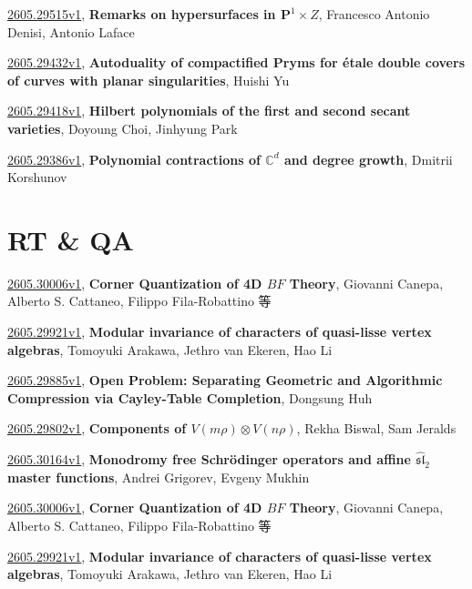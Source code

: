 \documentclass[9pt, a4paper]{article}
\theoremstyle{plain}
\theoremstyle{definition}
\theoremstyle{remark}
\newcommand{\arxiv}[3]{\href{https://arxiv.org/abs/#1}{#1}, \textbf{\textcolor{arxivblue}{#2}}, #3}
\begin{document}
\arxiv{2605.29515v1}{Remarks on hypersurfaces in $\mathbf{P}^1\times Z$}{Francesco Antonio Denisi, Antonio Laface}

\arxiv{2605.29432v1}{Autoduality of compactified Pryms for étale double covers of curves with planar singularities}{Huishi Yu}

\arxiv{2605.29418v1}{Hilbert polynomials of the first and second secant varieties}{Doyoung Choi, Jinhyung Park}

\arxiv{2605.29386v1}{Polynomial contractions of $\mathbb C^d$ and degree growth}{Dmitrii Korshunov}


\section{RT \& QA}
\arxiv{2605.30006v1}{Corner Quantization of 4D $BF$ Theory}{Giovanni Canepa, Alberto S. Cattaneo, Filippo Fila-Robattino 等}

\arxiv{2605.29921v1}{Modular invariance of characters of quasi-lisse vertex algebras}{Tomoyuki Arakawa, Jethro van Ekeren, Hao Li}

\arxiv{2605.29885v1}{Open Problem: Separating Geometric and Algorithmic Compression via Cayley-Table Completion}{Dongsung Huh}

\arxiv{2605.29802v1}{Components of $V(mρ) \otimes V(nρ)$}{Rekha Biswal, Sam Jeralds}

\arxiv{2605.30164v1}{Monodromy free Schrödinger operators and affine ${\widehat{\mathfrak{sl}}_2}$ master functions}{Andrei Grigorev, Evgeny Mukhin}

\arxiv{2605.30006v1}{Corner Quantization of 4D $BF$ Theory}{Giovanni Canepa, Alberto S. Cattaneo, Filippo Fila-Robattino 等}

\arxiv{2605.29921v1}{Modular invariance of characters of quasi-lisse vertex algebras}{Tomoyuki Arakawa, Jethro van Ekeren, Hao Li}

\end{document}
